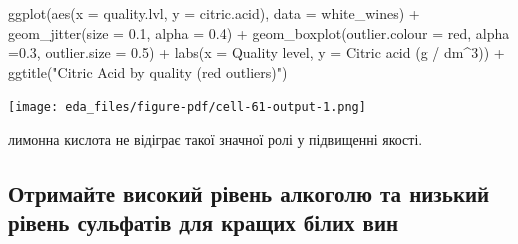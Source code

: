 \documentclass[
  letterpaper,
  DIV=11,
  numbers=noendperiod]{scrreprt}
\newenvironment{Shaded}{\begin{snugshade}}{\end{snugshade}}
\newcommand{\AttributeTok}[1]{\textcolor[rgb]{0.40,0.45,0.13}{#1}}
\newcommand{\FloatTok}[1]{\textcolor[rgb]{0.68,0.00,0.00}{#1}}
\newcommand{\FunctionTok}[1]{\textcolor[rgb]{0.28,0.35,0.67}{#1}}
\newcommand{\NormalTok}[1]{\textcolor[rgb]{0.00,0.23,0.31}{#1}}
\newcommand{\SpecialCharTok}[1]{\textcolor[rgb]{0.37,0.37,0.37}{#1}}
\newcommand{\StringTok}[1]{\textcolor[rgb]{0.13,0.47,0.30}{#1}}
\begin{document}
\begin{Shaded}
\begin{Highlighting}[]
\FunctionTok{ggplot}\NormalTok{(}\FunctionTok{aes}\NormalTok{(}\AttributeTok{x =}\NormalTok{ quality.lvl, }\AttributeTok{y =}\NormalTok{ citric.acid), }\AttributeTok{data =}\NormalTok{ white\_wines) }\SpecialCharTok{+}
  \FunctionTok{geom\_jitter}\NormalTok{(}\AttributeTok{size =} \FloatTok{0.1}\NormalTok{, }\AttributeTok{alpha =} \FloatTok{0.4}\NormalTok{) }\SpecialCharTok{+}
  \FunctionTok{geom\_boxplot}\NormalTok{(}\AttributeTok{outlier.colour =} \StringTok{\textquotesingle{}red\textquotesingle{}}\NormalTok{, }\AttributeTok{alpha =}\FloatTok{0.3}\NormalTok{, }\AttributeTok{outlier.size =} \FloatTok{0.5}\NormalTok{) }\SpecialCharTok{+}  
  \FunctionTok{labs}\NormalTok{(}\AttributeTok{x =} \StringTok{\textquotesingle{}Quality level\textquotesingle{}}\NormalTok{, }
       \AttributeTok{y =} \StringTok{\textquotesingle{}Citric acid (g / dm\^{}3)\textquotesingle{}}\NormalTok{) }\SpecialCharTok{+}
  \FunctionTok{ggtitle}\NormalTok{(}\StringTok{"Citric Acid by quality (red outliers)"}\NormalTok{)}
\end{Highlighting}
\end{Shaded}

\texttt{[image: eda\_files/figure-pdf/cell-61-output-1.png]}

лимонна кислота не відіграє такої значної ролі у підвищенні якості.

\subsection{Отримайте високий рівень алкоголю та низький рівень
сульфатів для кращих білих
вин}\label{ux43eux442ux440ux438ux43cux430ux439ux442ux435-ux432ux438ux441ux43eux43aux438ux439-ux440ux456ux432ux435ux43dux44c-ux430ux43bux43aux43eux433ux43eux43bux44e-ux442ux430-ux43dux438ux437ux44cux43aux438ux439-ux440ux456ux432ux435ux43dux44c-ux441ux443ux43bux44cux444ux430ux442ux456ux432-ux434ux43bux44f-ux43aux440ux430ux449ux438ux445-ux431ux456ux43bux438ux445-ux432ux438ux43d}
\end{document}
